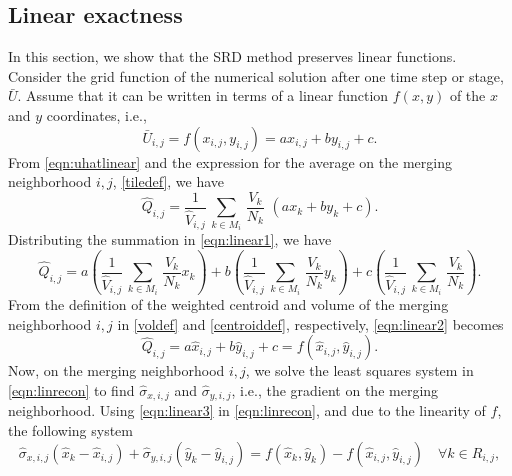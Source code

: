 \subsection{Linear exactness}
In this section, we show that the SRD method preserves linear functions.
Consider the grid function of the numerical solution after one time step
or stage, $\bar{U}$.  Assume that it can be written in terms of a linear function $f(x,y)$ of the $x$ and $y$ coordinates, i.e.,
\begin{equation}
    \label{eqn:uhatlinear}
\bar{U}_{i,j} = f(x_{i,j},y_{i,j}) = ax_{i,j} + by_{i,j} + c.
\end{equation}
From \eqref{eqn:uhatlinear} and the expression for the average on the merging neighborhood $i,j$, \eqref{tiledef}, we have
\begin{equation}
    \label{eqn:linear1}
\widehat{Q}_{i,j} = \frac{1}{{\widehat V}_{i,j}} \, \sum_{k \in M_i} \,  
\frac{V_k}{N_k}  \,\, (ax_{k} + by_{k} + c).
\end{equation}
Distributing the summation in \eqref{eqn:linear1}, we have
\begin{equation}\label{eqn:linear2}
\widehat{Q}_{i,j} =  a \left(\frac{1}{{\widehat V}_{i,j}} \, \sum_{k \in M_i} \,  
\frac{V_k}{N_k} x_{k} \right) + b\left(\frac{1}{{\widehat V}_{i,j}} \, \sum_{k \in M_i} \,  
\frac{V_k}{N_k} y_{k} \right) + c\left(\frac{1}{{\widehat V}_{i,j}} \, \sum_{k \in M_i} \,
\frac{V_k}{N_k}\right) .
\end{equation}
From the definition of the weighted centroid and volume of the merging neighborhood
$i,j$ in \eqref{voldef} and \eqref{centroiddef}, respectively, \eqref{eqn:linear2} becomes
\begin{equation}\label{eqn:linear3}
\widehat{Q}_{i,j} =  a \widehat{x}_{i,j} + b\widehat{y}_{i,j} + c = f(\widehat{x}_{i,j},\widehat{y}_{i,j}).
\end{equation}
Now, on the merging neighborhood $i,j$, we solve the least squares system in
\eqref{eqn:linrecon} to find $\widehat{\sigma}_{x,i,j}$ and
$\widehat{\sigma}_{y,i,j}$, i.e., the gradient on the merging neighborhood.  Using
\eqref{eqn:linear3} in \eqref{eqn:linrecon}, and due to the linearity of $f$, the following system
\begin{equation}
\widehat{\sigma}_{x,i,j}(\widehat{x}_{k} - \widehat{x}_{i,j}) + \widehat{\sigma}_{y,i,j}(\widehat{y}_{k} - \widehat{y}_{i,j})= f(\widehat{x}_k, \widehat{y}_k) - f(\widehat{x}_{i,j}, \widehat{y}_{i,j}) \quad \forall k \in R_{i,j},
\end{equation}
